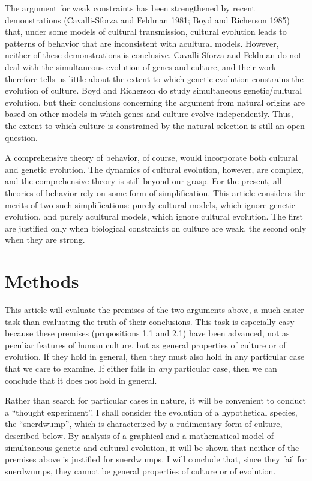 \documentclass[11pt]{article}
\begin{document}
The argument for weak constraints has been strengthened by recent
demonstrations (Cavalli-Sforza and Feldman 1981; Boyd and Richerson 1985)
that, under some models of cultural transmission, cultural evolution leads
to patterns of behavior that are inconsistent with acultural models.
However, neither of these demonstrations is conclusive.  Cavalli-Sforza
and Feldman do not deal with the simultaneous evolution of genes and
culture, and their work therefore tells us little about the extent to
which genetic evolution constrains the evolution of culture.  Boyd and
Richerson do study simultaneous genetic/cultural evolution, but their
conclusions concerning the argument from natural origins are based on
other models in which genes and culture evolve independently.  Thus, the
extent to which culture is constrained by the natural selection is still
an open question.

A comprehensive theory of behavior, of course, would incorporate both
cultural and genetic evolution.  The dynamics of cultural evolution,
however, are complex, and the comprehensive theory is still beyond our
grasp.  For the present, all theories of behavior rely on some form
of simplification.  This article considers the merits of two such
simplifications: purely cultural models, which ignore genetic evolution,
and purely acultural models, which ignore cultural evolution.  The first
are justified only when biological constraints on culture are weak, the
second only when they are strong.

\section{Methods}

This article will evaluate the premises of the two arguments above, a much
easier task than evaluating the truth of their conclusions.  This task is
especially easy because these premises (propositions 1.1 and 2.1) have
been advanced, not as peculiar features of human culture, but as general
properties of culture or of evolution.  If they hold in general, then they
must also hold in any particular case that we care to examine.  If either
fails in \emph{any} particular case, then we can conclude that it does
not hold in general.

Rather than search for particular cases in nature, it will be convenient
to conduct a ``thought experiment''.  I shall consider the evolution of a
hypothetical species, the ``snerdwump'', which is characterized by
a rudimentary form of culture, described below.  By analysis of a
graphical and a mathematical model of simultaneous genetic and cultural
evolution, it will be shown that neither of the premises above is
justified for snerdwumps.  I will conclude that, since they fail for
snerdwumps, they cannot be general properties of culture or of evolution.
\end{document}
